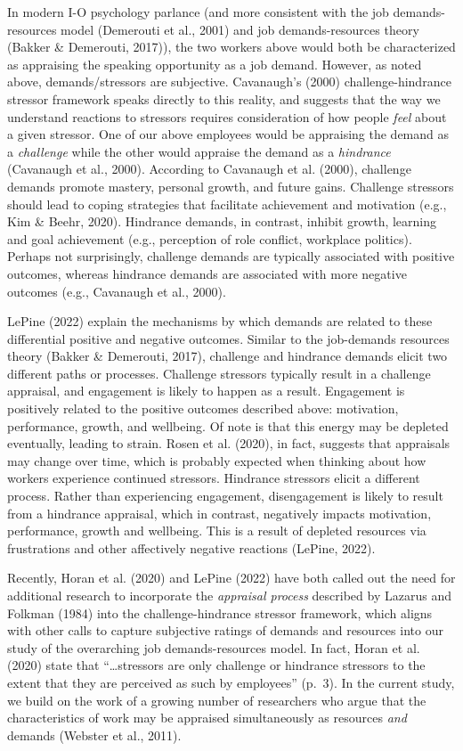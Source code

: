 \documentclass[
  jou]{apa6}
\begin{document}
In modern I-O psychology parlance (and more consistent with the job demands-resources model (Demerouti et al., 2001) and job demands-resources theory (Bakker \& Demerouti, 2017)), the two workers above would both be characterized as appraising the speaking opportunity as a job demand. However, as noted above, demands/stressors are subjective. Cavanaugh's (2000) challenge-hindrance stressor framework speaks directly to this reality, and suggests that the way we understand reactions to stressors requires consideration of how people \emph{feel} about a given stressor. One of our above employees would be appraising the demand as a \emph{challenge} while the other would appraise the demand as a \emph{hindrance} (Cavanaugh et al., 2000). According to Cavanaugh et al. (2000), challenge demands promote mastery, personal growth, and future gains. Challenge stressors should lead to coping strategies that facilitate achievement and motivation (e.g., Kim \& Beehr, 2020). Hindrance demands, in contrast, inhibit growth, learning and goal achievement (e.g., perception of role conflict, workplace politics). Perhaps not surprisingly, challenge demands are typically associated with positive outcomes, whereas hindrance demands are associated with more negative outcomes (e.g., Cavanaugh et al., 2000).

LePine (2022) explain the mechanisms by which demands are related to these differential positive and negative outcomes. Similar to the job-demands resources theory (Bakker \& Demerouti, 2017), challenge and hindrance demands elicit two different paths or processes. Challenge stressors typically result in a challenge appraisal, and engagement is likely to happen as a result. Engagement is positively related to the positive outcomes described above: motivation, performance, growth, and wellbeing. Of note is that this energy may be depleted eventually, leading to strain. Rosen et al. (2020), in fact, suggests that appraisals may change over time, which is probably expected when thinking about how workers experience continued stressors. Hindrance stressors elicit a different process. Rather than experiencing engagement, disengagement is likely to result from a hindrance appraisal, which in contrast, negatively impacts motivation, performance, growth and wellbeing. This is a result of depleted resources via frustrations and other affectively negative reactions (LePine, 2022).

Recently, Horan et al. (2020) and LePine (2022) have both called out the need for additional research to incorporate the \emph{appraisal process} described by Lazarus and Folkman (1984) into the challenge-hindrance stressor framework, which aligns with other calls to capture subjective ratings of demands and resources into our study of the overarching job demands-resources model. In fact, Horan et al. (2020) state that ``\ldots stressors are only challenge or hindrance stressors to the extent that they are perceived as such by employees'' (p.~3). In the current study, we build on the work of a growing number of researchers who argue that the characteristics of work may be appraised simultaneously as resources \emph{and} demands (Webster et al., 2011).
\end{document}

